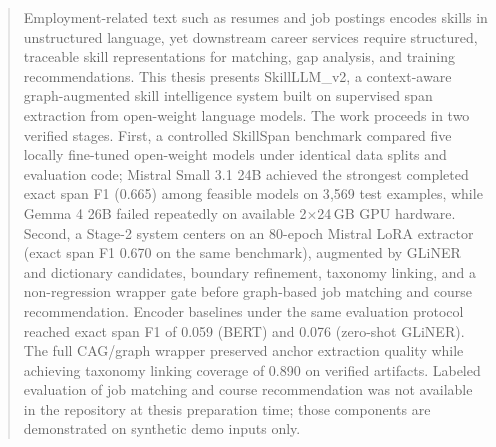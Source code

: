 \begin{abstract}
Employment-related text such as resumes and job postings encodes skills in unstructured language, yet downstream career services require structured, traceable skill representations for matching, gap analysis, and training recommendations.
This thesis presents SkillLLM\_v2, a context-aware graph-augmented skill intelligence system built on supervised span extraction from open-weight language models.
The work proceeds in two verified stages.
First, a controlled SkillSpan benchmark compared five locally fine-tuned open-weight models under identical data splits and evaluation code; Mistral Small 3.1 24B achieved the strongest completed exact span F1 (0.665) among feasible models on 3{,}569 test examples, while Gemma 4 26B failed repeatedly on available 2$\times$24\,GB GPU hardware.
Second, a Stage-2 system centers on an 80-epoch Mistral LoRA extractor (exact span F1 0.670 on the same benchmark), augmented by GLiNER and dictionary candidates, boundary refinement, taxonomy linking, and a non-regression wrapper gate before graph-based job matching and course recommendation.
Encoder baselines under the same evaluation protocol reached exact span F1 of 0.059 (BERT) and 0.076 (zero-shot GLiNER).
The full CAG/graph wrapper preserved anchor extraction quality while achieving taxonomy linking coverage of 0.890 on verified artifacts.
Labeled evaluation of job matching and course recommendation was not available in the repository at thesis preparation time; those components are demonstrated on synthetic demo inputs only.
\end{abstract}
